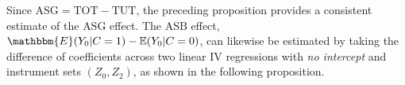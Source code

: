 \begin{appendix}
%

Since $\text{ASG} = \text{TOT} - \text{TUT}$, the preceding proposition provides a consistent estimate of the $\text{ASG}$ effect.
The $\text{ASB}$ effect, $\mathbbm{E}(Y_0|C=1) - \mathbb{E}(Y_0|C=0)$, can likewise be estimated by taking the difference of coefficients across two linear IV regressions with \emph{no intercept} and instrument sets $(Z_0, Z_2)$, as shown in the following proposition.


\end{appendix}
